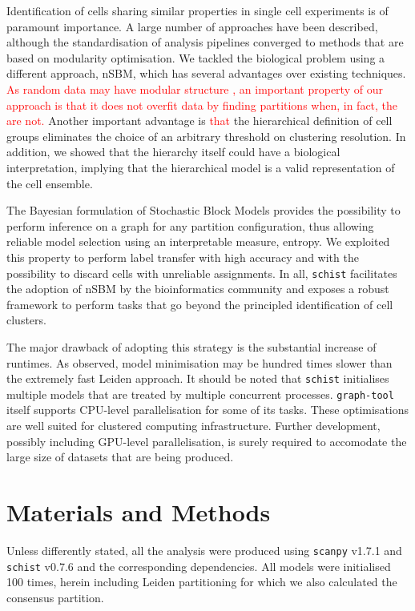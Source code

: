 \documentclass[10pt]{article}
\begin{document}
Identification of cells sharing similar properties in single cell experiments is of paramount importance. A large number of approaches have been described, although the standardisation of analysis pipelines converged to methods that are based on modularity optimisation. We tackled the biological problem using a different approach, nSBM, which has several advantages over existing techniques. \textcolor{red}{As  random data may have modular structure \cite{guimer_2004}, an important property of our approach is that it does not overfit data by finding partitions when, in fact, the are not.} Another important advantage is \textcolor{red}{that} the hierarchical definition of cell groups eliminates the choice of an arbitrary threshold on clustering resolution. In addition, we showed that the hierarchy itself could have a biological interpretation, implying that the hierarchical model is a valid representation of the cell ensemble. 

The Bayesian formulation of Stochastic Block Models provides the possibility to perform inference on a graph for any partition configuration, thus allowing reliable model selection using an interpretable measure, entropy. We exploited this property to perform label transfer with high accuracy and with the possibility to discard cells with unreliable assignments. In all, \texttt{schist} facilitates the adoption of nSBM by the bioinformatics community and exposes a robust framework to perform tasks that go beyond the principled identification of cell clusters. 

The major drawback of adopting this strategy is the substantial increase of runtimes. As observed, model minimisation may be hundred times slower than the extremely fast Leiden approach. It should be noted that \texttt{schist} initialises multiple models that are treated by multiple concurrent processes. \texttt{graph-tool} itself supports CPU-level parallelisation for some of its tasks. These optimisations are well suited for clustered computing infrastructure. Further development, possibly including GPU-level parallelisation, is surely required to accomodate the large size of datasets that are being produced.

\section*{Materials and Methods}

Unless differently stated, all the analysis were produced using \texttt{scanpy} v1.7.1 \cite{wolf_2018} and \texttt{schist} v0.7.6 and the corresponding dependencies. All models were initialised 100 times, herein including Leiden partitioning for which we also calculated the consensus partition.
\end{document}
